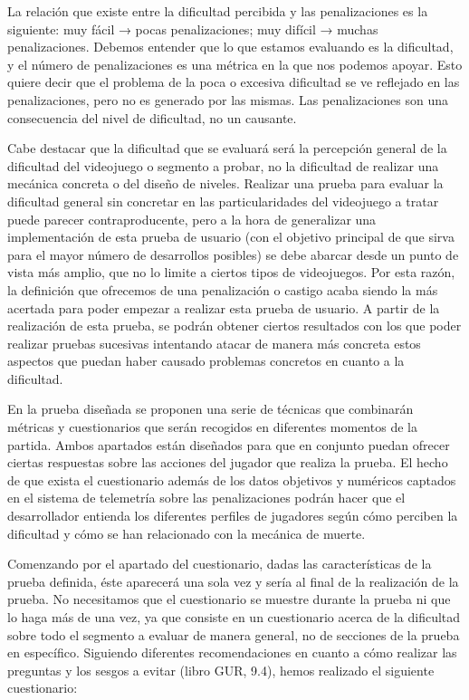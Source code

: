 La relación que existe entre la dificultad percibida y las penalizaciones es la siguiente: muy fácil → pocas penalizaciones; muy difícil → muchas penalizaciones. Debemos entender que lo que estamos evaluando es la dificultad, y el número de penalizaciones es una métrica en la que nos podemos apoyar. Esto quiere decir que el problema de la poca o excesiva dificultad se ve reflejado en las penalizaciones, pero no es generado por las mismas. Las penalizaciones son una consecuencia del nivel de dificultad, no un causante.


Cabe destacar que la dificultad que se evaluará será la percepción general de la dificultad del videojuego o segmento a probar, no la dificultad de realizar una mecánica concreta o del diseño de niveles. Realizar una prueba para evaluar la dificultad general sin concretar en las particularidades del videojuego a tratar puede parecer contraproducente, pero a la hora de generalizar una implementación de esta prueba de usuario (con el objetivo principal de que sirva para el mayor número de desarrollos posibles) se debe abarcar desde un punto de vista más amplio, que no lo limite a ciertos tipos de videojuegos. Por esta razón, la definición que ofrecemos de una penalización o castigo acaba siendo la más acertada para poder empezar a realizar esta prueba de usuario. A partir de la realización de esta prueba, se podrán obtener ciertos resultados con los que poder realizar pruebas sucesivas intentando atacar de manera más concreta estos aspectos que puedan haber causado problemas concretos en cuanto a la dificultad.


En la prueba diseñada se proponen una serie de técnicas que combinarán métricas y cuestionarios que serán recogidos en diferentes momentos de la partida. Ambos apartados están diseñados para que en conjunto puedan ofrecer ciertas respuestas sobre las acciones del jugador que realiza la prueba. El hecho de que exista el cuestionario además de los datos objetivos y numéricos captados en el sistema de telemetría sobre las penalizaciones podrán hacer que el desarrollador entienda los diferentes perfiles de jugadores según cómo perciben la dificultad y cómo se han relacionado con la mecánica de muerte.


Comenzando por el apartado del cuestionario, dadas las características de la prueba definida, éste aparecerá una sola vez y sería al final de la realización de la prueba. No necesitamos que el cuestionario se muestre durante la prueba ni que lo haga más de una vez, ya que consiste en un cuestionario acerca de la dificultad sobre todo el segmento a evaluar de manera general, no de secciones de la prueba en específico. Siguiendo diferentes recomendaciones en cuanto a cómo realizar las preguntas y los sesgos a evitar (libro GUR, 9.4), hemos realizado el siguiente cuestionario:%


